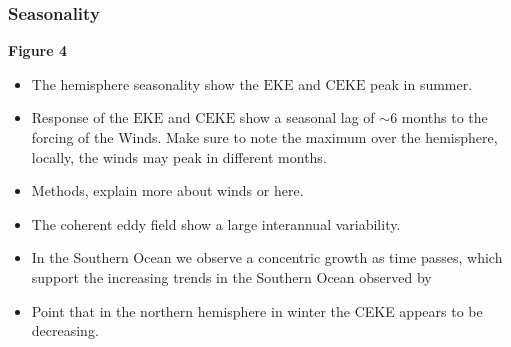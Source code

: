 \documentclass[draft,linenumbers]{agujournal2019}
\newcommand{\EKE}{\textrm{EKE}}
\newcommand{\CEKE}{\textrm{CEKE}}
\begin{document}
	\subsubsection{Seasonality}

	\textbf{Figure 4}
	\begin{itemize}
		\item The hemisphere seasonality show the  $\EKE$ and $\CEKE$ peak in summer.
		\item Response of the $\EKE$ and $\CEKE$ show a seasonal lag of $\sim$6 months to the forcing of the Winds. Make sure to note the maximum over the hemisphere, locally, the winds may peak in different months. 
		\item Methods, explain more about winds or here. 
		\item The coherent eddy field show a large interannual variability.
		\item In the Southern Ocean we observe a concentric growth as time passes, which support the increasing trends in the Southern Ocean observed by \citep{Hogg_Recent_2015,Martinez_Kinetic_2019,Martinez_Kinetic_2021}
		\item Point that in the northern hemisphere in winter the CEKE appears to be decreasing.
	\end{itemize}
\end{document}
